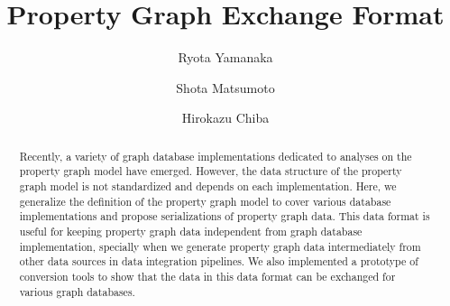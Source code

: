 \documentclass[runningheads]{llncs}
\begin{document}
\newtheorem{defi}[theorem]{Definition}
%
\title{Property Graph Exchange Format}
%
%
\author{Ryota Yamanaka \and Shota Matsumoto \and Hirokazu Chiba}
%
%
%
\maketitle              %
%
\begin{abstract}
Recently, a variety of graph database implementations dedicated to analyses on the property graph model have emerged.
However, the data structure of the property graph model is not standardized and depends on each implementation.
Here, we generalize the definition of the property graph model to cover various database implementations and propose serializations of property graph data. 
This data format is useful for keeping property graph data independent from graph database implementation, specially when we generate property graph data intermediately from other data sources in data integration pipelines. We also implemented a prototype of conversion tools to show that the data in this data format can be exchanged for various graph databases.
\end{abstract}
\end{document}
